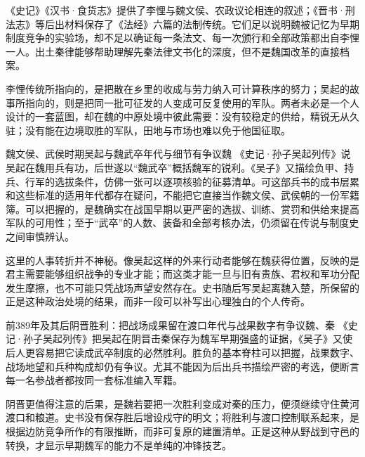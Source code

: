 \begin{debate}
《史记》《汉书·食货志》提供了李悝与魏文侯、农政议论相连的叙述；《晋书·刑法志》等后出材料保存了《法经》六篇的法制传统。它们足以说明魏被记忆为早期制度竞争的实验场，却不足以确证每一条法文、每一次颁行和全部政策都出自李悝一人。出土秦律能够帮助理解先秦法律文书化的深度，但不是魏国改革的直接档案。
\end{debate}

李悝传统所指向的，是把散在乡里的收成与劳力纳入可计算秩序的努力；吴起的故事所指向的，则是把同一批可征发的人变成可反复使用的军队。两者未必是一个人设计的一套蓝图，却在魏的中原处境中彼此需要：没有较稳定的供给，精锐无从久驻；没有能在边境取胜的军队，田地与市场也难以免于他国征取。

\begin{event}{魏文侯、武侯时期}{吴起与魏武卒}{年代与细节有争议}{魏}
《史记·孙子吴起列传》说吴起在魏用兵有功，后世遂以“魏武卒”概括魏军的锐利。《吴子》又描绘负甲、持兵、行军的选拔条件，仿佛一张可以逐项核验的征募清单。可这部兵书的成书层累和这些标准的适用年代都存在疑问，不能把它直接当作魏文侯、武侯朝的一份军籍簿。可以把握的，是魏确实在战国早期以更严密的选拔、训练、赏罚和供给来提高军队的可用性；至于“武卒”的人数、装备和全部考核办法，仍须留在传说与制度史之间审慎辨认。

这里的人事转折并不神秘。像吴起这样的外来行动者能够在魏获得位置，反映的是君主需要能够组织战争的专业才能；而这类才能一旦与旧有贵族、君权和军功分配发生摩擦，也不可能只凭战场声望安然存在。史书随后写吴起离魏入楚，所保留的正是这种政治处境的结果，而非一段可以补写出心理独白的个人传奇。
\end{event}

\begin{event}{前389年及其后}{阴晋胜利：把战场成果留在渡口}{年代与战果数字有争议}{魏、秦}
《史记·孙子吴起列传》把吴起在阴晋击秦保存为魏军早期强盛的证据，《吴子》又使后人更容易把它读成武卒制度的必然胜利。胜负的基本脊柱可以把握，战果数字、战场地望和兵种构成却仍有争议。尤其不能因为后出兵书描绘严密的考选，便断言每一名参战者都按同一套标准编入军籍。

阴晋更值得注意的后果，是魏若要把一次胜利变成对秦的压力，便须继续守住黄河渡口和粮道。史书没有保存胜后增设戍守的明文；将胜利与渡口控制联系起来，是根据边防竞争所作的有限推断，而非可复原的建置清单。正是这种从野战到守邑的转换，才显示早期魏军的能力不是单纯的冲锋技艺。
\end{event}

